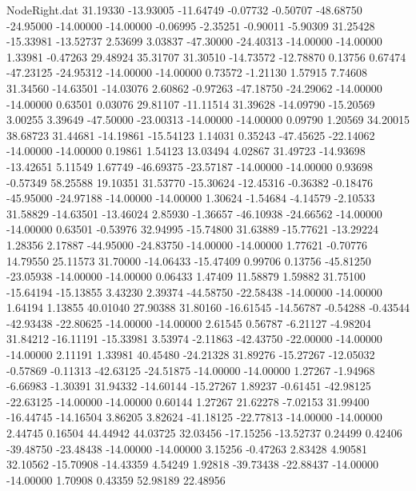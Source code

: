 \begin{filecontents}{NodeRight.dat}
  31.19330  -13.93005  -11.64749    -0.07732   -0.50707  -48.68750  -24.95000  -14.00000  -14.00000   -0.06995   -2.35251   -0.90011   -5.90309
  31.25428  -15.33981  -13.52737     2.53699    3.03837  -47.30000  -24.40313  -14.00000  -14.00000    1.33981   -0.47263   29.48924   35.31707
  31.30510  -14.73572  -12.78870     0.13756    0.67474  -47.23125  -24.95312  -14.00000  -14.00000    0.73572   -1.21130    1.57915    7.74608
  31.34560  -14.63501  -14.03076     2.60862   -0.97263  -47.18750  -24.29062  -14.00000  -14.00000    0.63501    0.03076   29.81107  -11.11514
  31.39628  -14.09790  -15.20569     3.00255    3.39649  -47.50000  -23.00313  -14.00000  -14.00000    0.09790    1.20569   34.20015   38.68723
  31.44681  -14.19861  -15.54123     1.14031    0.35243  -47.45625  -22.14062  -14.00000  -14.00000    0.19861    1.54123   13.03494    4.02867
  31.49723  -14.93698  -13.42651     5.11549    1.67749  -46.69375  -23.57187  -14.00000  -14.00000    0.93698   -0.57349   58.25588   19.10351
  31.53770  -15.30624  -12.45316    -0.36382   -0.18476  -45.95000  -24.97188  -14.00000  -14.00000    1.30624   -1.54684   -4.14579   -2.10533
  31.58829  -14.63501  -13.46024     2.85930   -1.36657  -46.10938  -24.66562  -14.00000  -14.00000    0.63501   -0.53976   32.94995  -15.74800
  31.63889  -15.77621  -13.29224     1.28356    2.17887  -44.95000  -24.83750  -14.00000  -14.00000    1.77621   -0.70776   14.79550   25.11573
  31.70000  -14.06433  -15.47409     0.99706    0.13756  -45.81250  -23.05938  -14.00000  -14.00000    0.06433    1.47409   11.58879    1.59882
  31.75100  -15.64194  -15.13855     3.43230    2.39374  -44.58750  -22.58438  -14.00000  -14.00000    1.64194    1.13855   40.01040   27.90388
  31.80160  -16.61545  -14.56787    -0.54288   -0.43544  -42.93438  -22.80625  -14.00000  -14.00000    2.61545    0.56787   -6.21127   -4.98204
  31.84212  -16.11191  -15.33981     3.53974   -2.11863  -42.43750  -22.00000  -14.00000  -14.00000    2.11191    1.33981   40.45480  -24.21328
  31.89276  -15.27267  -12.05032    -0.57869   -0.11313  -42.63125  -24.51875  -14.00000  -14.00000    1.27267   -1.94968   -6.66983   -1.30391
  31.94332  -14.60144  -15.27267     1.89237   -0.61451  -42.98125  -22.63125  -14.00000  -14.00000    0.60144    1.27267   21.62278   -7.02153
  31.99400  -16.44745  -14.16504     3.86205    3.82624  -41.18125  -22.77813  -14.00000  -14.00000    2.44745    0.16504   44.44942   44.03725
  32.03456  -17.15256  -13.52737     0.24499    0.42406  -39.48750  -23.48438  -14.00000  -14.00000    3.15256   -0.47263    2.83428    4.90581
  32.10562  -15.70908  -14.43359     4.54249    1.92818  -39.73438  -22.88437  -14.00000  -14.00000    1.70908    0.43359   52.98189   22.48956

\end{filecontents}
